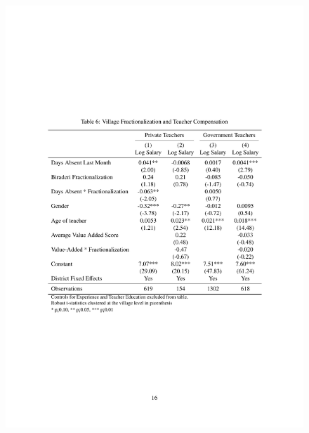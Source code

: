 \documentclass{beamer}
\begin{document}
\begin{frame}{}
\begin{figure}[htb]
	\begin{center}
	\includegraphics[scale=0.65]{tables/frac_and_compensation.pdf}
	\end{center}
\end{figure}
\end{frame}
\end{document}
